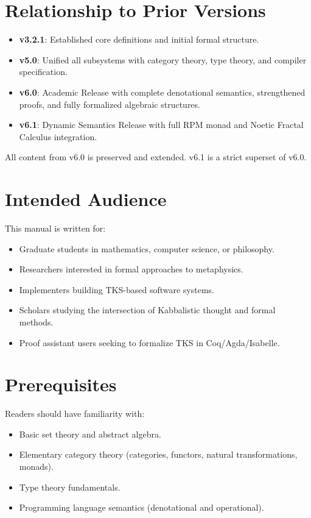 \documentclass[11pt,twoside,openright]{book}
\theoremstyle{definition}
\theoremstyle{plain}
\theoremstyle{remark}
\begin{document}
\section*{Relationship to Prior Versions}

\begin{itemize}
  \item \textbf{v3.2.1}: Established core definitions and initial formal structure.
  \item \textbf{v5.0}: Unified all subsystems with category theory, type theory, and compiler specification.
  \item \textbf{v6.0}: Academic Release with complete denotational semantics, strengthened proofs, and fully formalized algebraic structures.
  \item \textbf{v6.1}: Dynamic Semantics Release with full RPM monad and Noetic Fractal Calculus integration.
\end{itemize}

All content from v6.0 is preserved and extended. v6.1 is a strict superset of v6.0.

\section*{Intended Audience}

This manual is written for:
\begin{itemize}
  \item Graduate students in mathematics, computer science, or philosophy.
  \item Researchers interested in formal approaches to metaphysics.
  \item Implementers building TKS-based software systems.
  \item Scholars studying the intersection of Kabbalistic thought and formal methods.
  \item Proof assistant users seeking to formalize TKS in Coq/Agda/Isabelle.
\end{itemize}

\section*{Prerequisites}

Readers should have familiarity with:
\begin{itemize}
  \item Basic set theory and abstract algebra.
  \item Elementary category theory (categories, functors, natural transformations, monads).
  \item Type theory fundamentals.
  \item Programming language semantics (denotational and operational).
\end{itemize}
\end{document}

